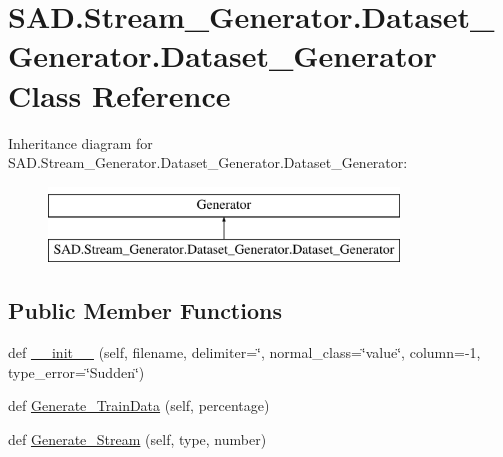 \hypertarget{classSAD_1_1Stream__Generator_1_1Dataset__Generator_1_1Dataset__Generator}{}\section{S\+A\+D.\+Stream\+\_\+\+Generator.\+Dataset\+\_\+\+Generator.\+Dataset\+\_\+\+Generator Class Reference}
\label{classSAD_1_1Stream__Generator_1_1Dataset__Generator_1_1Dataset__Generator}
Inheritance diagram for S\+A\+D.\+Stream\+\_\+\+Generator.\+Dataset\+\_\+\+Generator.\+Dataset\+\_\+\+Generator\+:\begin{figure}[H]
\begin{center}
\leavevmode
\includegraphics[height=2.000000cm]{classSAD_1_1Stream__Generator_1_1Dataset__Generator_1_1Dataset__Generator}
\end{center}
\end{figure}
\subsection*{Public Member Functions}
\begin{DoxyCompactItemize}
\item 
def \hyperlink{classSAD_1_1Stream__Generator_1_1Dataset__Generator_1_1Dataset__Generator_a96fe8d29f2e2d15797d6ed779df19648}{\+\_\+\+\_\+init\+\_\+\+\_\+} (self, filename, delimiter=\char`\"{},  normal\+\_\+class=\char`\"{}value\char`\"{},  column=-\/1,  type\+\_\+error=\char`\"{}Sudden\char`\"{})
\item 
def \hyperlink{classSAD_1_1Stream__Generator_1_1Dataset__Generator_1_1Dataset__Generator_ab370a4bfa53c33a13085cae10de52a5a}{Generate\+\_\+\+Train\+Data} (self, percentage)
\item 
def \hyperlink{classSAD_1_1Stream__Generator_1_1Dataset__Generator_1_1Dataset__Generator_a168344d3d081678884e42083cc0ef033}{Generate\+\_\+\+Stream} (self, type, number)
\end{DoxyCompactItemize}
